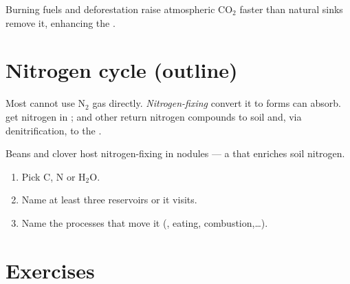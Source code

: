 \begin{proposition}\label{prop:g9:cycles:fossil}
Burning  fuels and deforestation raise atmospheric $\mathrm{CO_2}$
faster than natural sinks remove it, enhancing the .
\end{proposition}
\admitted

\section{Nitrogen cycle (outline)}

\begin{definition}\label{def:g9:cycles:nitrogen}
Most  cannot use $\mathrm{N_2}$ gas directly.
\emph{Nitrogen-fixing}  convert it to
forms  can absorb.  get nitrogen in ; 
and other  return nitrogen compounds to soil and, via denitrification,
to the .
\end{definition}

\begin{example}[Legumes]\label{ex:g9:cycles:legume}
Beans and clover host nitrogen-fixing  in  nodules --- a
 that enriches soil nitrogen.
\end{example}

\begin{method}\label{met:g9:cycles:track}
\begin{enumerate}
  \item Pick C, N or $\mathrm{H_2O}$.
  \item Name at least three reservoirs or  it visits.
  \item Name the processes that move it (, eating,
        combustion,\ldots).
\end{enumerate}
\end{method}

\section{Exercises}

